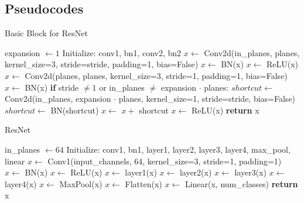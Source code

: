 \documentclass[10pt]{article}
\begin{document}
\subsection{Pseudocodes}
\begin{algorithm}[H]
  \caption{Basic Block for ResNet}
  \begin{algorithmic}[1]
      \State expansion $\gets 1$
      \State
      \State Initialize: conv1, bn1, conv2, bn2
      \State
      \State $x \gets$ Conv2d(in\_planes, planes, kernel\_size=3, stride=stride, padding=1, bias=False) 
      \State $x \gets$ BN(x) 
      \State $x \gets$ ReLU(x) 
      \State
      \State $x \gets$ Conv2d(planes, planes, kernel\_size=3, stride=1, padding=1, bias=False) 
      \State $x \gets$ BN(x) 
      \State
      \State \textbf{if} stride $\neq 1$ or in\_planes $\neq$ expansion $\cdot$ planes:
      \State \hspace{1cm} $shortcut \gets$ Conv2d(in\_planes, expansion $\cdot$ planes, kernel\_size=1, stride=stride, bias=False) 
      \State \hspace{1cm} $shortcut \gets$ BN(shortcut) 
      \State
      \State $x \gets$ $x +$ shortcut 
      \State $x \gets$ ReLU(x) 
      \State
      \State \textbf{return} x 
    \EndProcedure
  \end{algorithmic}
\end{algorithm}


\begin{algorithm}[H]
  \caption{ResNet}
  \begin{algorithmic}[1]
      \State in\_planes $\gets 64$
      \State
      \State Initialize: conv1, bn1, layer1, layer2, layer3, layer4, max\_pool, linear
      \State
      \State $x \gets$ Conv1(input\_channels, 64, kernel\_size=3, stride=1, padding=1) 
      \State $x \gets$ BN(x) 
      \State $x \gets$ ReLU(x) 
      \State
      \State $x \gets$ layer1(x) 
      \State $x \gets$ layer2(x) 
      \State $x \gets$ layer3(x) 
      \State $x \gets$ layer4(x) 
      \State
      \State $x \gets$ MaxPool(x) 
      \State $x \gets$ Flatten(x) 
      \State $x \gets$ Linear(x, num\_classes) 
      \State
      \State \textbf{return} x 
    \EndProcedure
  \end{algorithmic}
\end{algorithm}
\end{document}
